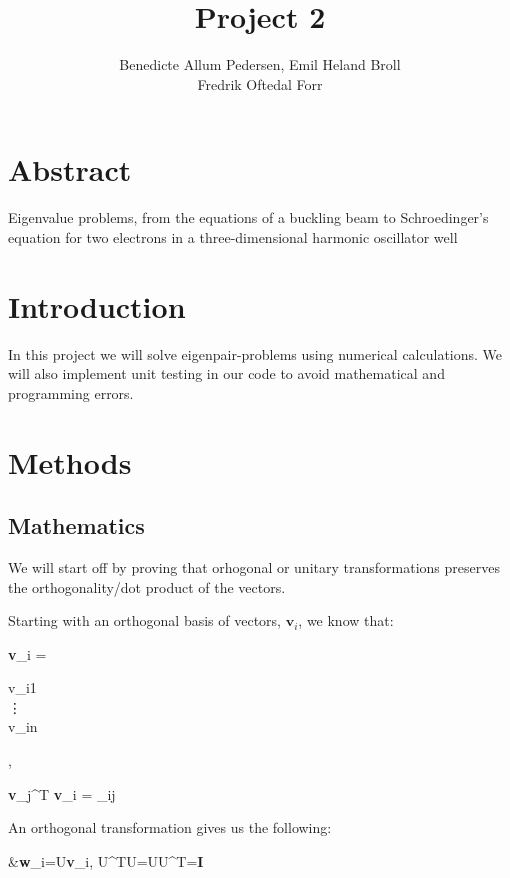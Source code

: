 \documentclass{article}
\title{Project 2}\vspace{-3ex}
\author{Benedicte Allum Pedersen, Emil Heland Broll\\ Fredrik Oftedal Forr}
\date{\vspace{-5ex}}
\begin{document}
\maketitle

\section{Abstract}
	Eigenvalue problems, from the equations of a buckling beam to Schroedinger's equation for two electrons in a three-dimensional harmonic oscillator well

\section{Introduction}
	In this project we will solve eigenpair-problems using numerical calculations.
	We will also implement unit testing in our code to avoid mathematical and programming errors.

\section{Methods}
	\subsection{Mathematics}
		We will start off by proving that orhogonal or unitary transformations preserves the orthogonality/dot product of the vectors.

		Starting with an orthogonal basis of vectors, $\textbf{v}_i$, we know that:

		\begin{flalign*}
		\begin{aligned}
			\textbf{v}_i = \begin{bmatrix}
			v_{i1} \\
			\vdots \\
			v_{in}
			\end{bmatrix},
		\end{aligned}
		\qquad
		\begin{aligned}
			\textbf{v}_j^T \textbf{v}_i = \delta_{ij}
		\end{aligned}
		\end{flalign*}

		An orthogonal transformation gives us the following:
		\begin{flalign*}
		&\textbf{w}_i=U\textbf{v}_i,  U^TU=UU^T=\textbf{I}
		\end{flalign*}
\end{document}
